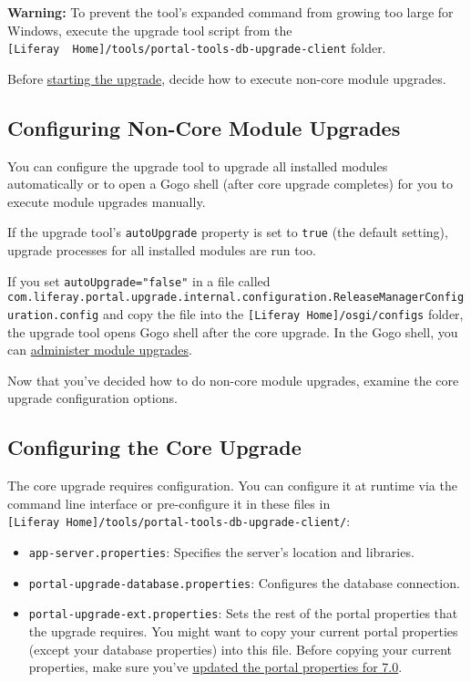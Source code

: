 \noindent\hrulefill

\textbf{Warning:} To prevent the tool's expanded command from growing
too large for Windows, execute the upgrade tool script from the
\texttt{{[}Liferay\ \ Home{]}/tools/portal-tools-db-upgrade-client}
folder.

\noindent\hrulefill

Before \hyperref[running-and-managing-the-core-upgrade]{starting the
upgrade}, decide how to execute non-core module upgrades.

\subsection{Configuring Non-Core Module
Upgrades}\label{configuring-non-core-module-upgrades}

You can configure the upgrade tool to upgrade all installed modules
automatically or to open a Gogo shell (after core upgrade completes) for
you to execute module upgrades manually.

If the upgrade tool's \texttt{autoUpgrade} property is set to
\texttt{true} (the default setting), upgrade processes for all installed
modules are run too.

If you set \texttt{autoUpgrade="false"} in a file called
\texttt{com.liferay.portal.upgrade.internal.configuration.ReleaseManagerConfiguration.config}
and copy the file into the \texttt{{[}Liferay\ Home{]}/osgi/configs}
folder, the upgrade tool opens Gogo shell after the core upgrade. In the
Gogo shell, you can
\hyperref[gogo-shell-commands-for-module-upgrades]{administer module
upgrades}.

Now that you've decided how to do non-core module upgrades, examine the
core upgrade configuration options.

\subsection{Configuring the Core
Upgrade}\label{configuring-the-core-upgrade}

The core upgrade requires configuration. You can configure it at runtime
via the command line interface or pre-configure it in these files in
\texttt{{[}Liferay\ Home{]}/tools/portal-tools-db-upgrade-client/}:

\begin{itemize}
\tightlist
\item
  \texttt{app-server.properties}: Specifies the server's location and
  libraries.
\item
  \texttt{portal-upgrade-database.properties}: Configures the database
  connection.
\item
  \texttt{portal-upgrade-ext.properties}: Sets the rest of the portal
  properties that the upgrade requires. You might want to copy your
  current portal properties (except your database properties) into this
  file. Before copying your current properties, make sure you've
  \href{/docs/7-0/deploy/-/knowledge_base/d/preparing-an-upgrade-to-liferay-7\#step-5-update-your-portal-properties}{updated
  the portal properties for 7.0}.
\end{itemize}

